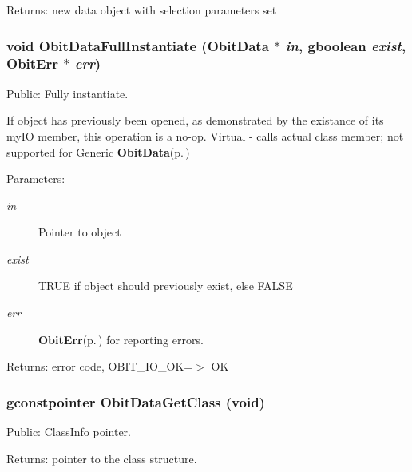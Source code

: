 \begin{Desc}
\item[Returns:]new data object with selection parameters set \end{Desc}
\subsubsection{\setlength{\rightskip}{0pt plus 5cm}void Obit\-Data\-Full\-Instantiate ({\bf Obit\-Data} $\ast$ {\em in}, gboolean {\em exist}, {\bf Obit\-Err} $\ast$ {\em err})}\label{ObitData_8c_a18}


Public: Fully instantiate. 

If object has previously been opened, as demonstrated by the existance of its my\-IO member, this operation is a no-op. Virtual - calls actual class member; not supported for Generic {\bf Obit\-Data}{\rm (p.\,\pageref{structObitData})} \begin{Desc}
\item[Parameters:]
\begin{description}
\item[{\em in}]Pointer to object \item[{\em exist}]TRUE if object should previously exist, else FALSE \item[{\em err}]{\bf Obit\-Err}{\rm (p.\,\pageref{structObitErr})} for reporting errors. \end{description}
\end{Desc}
\begin{Desc}
\item[Returns:]error code, OBIT\_\-IO\_\-OK=$>$ OK \end{Desc}
\subsubsection{\setlength{\rightskip}{0pt plus 5cm}gconstpointer Obit\-Data\-Get\-Class (void)}\label{ObitData_8c_a10}


Public: Class\-Info pointer. 

\begin{Desc}
\item[Returns:]pointer to the class structure. \end{Desc}

